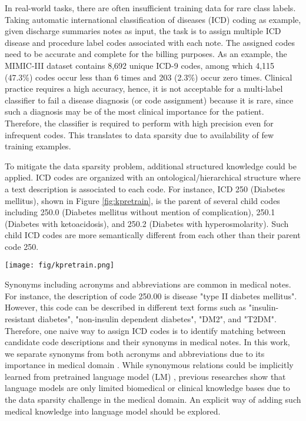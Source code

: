 \documentclass[11pt]{article}
\begin{document}
In real-world tasks, there are often insufficient training data for 
rare class labels. 
Taking automatic international classification of diseases (ICD) coding as example, 
given discharge summaries notes as input, the task is to assign multiple ICD disease and procedure label codes associated with each note. The assigned codes need to be accurate and complete for the billing purposes.
As an example, the MIMIC-III dataset \citep{Johnson2016MIMICIIIAF} contains 8,692 unique ICD-9 codes, among which 4,115 (47.3\%) codes occur less than 6 times and 203 (2.3\%) occur zero times. Clinical practice requires a high accuracy, hence, it is not acceptable 
for a multi-label classifier to fail a disease diagnosis (or code assignment) because it is rare, since such a diagnosis may be of the most clinical importance for the patient. Therefore, the classifier is required to perform with high precision even for infrequent codes. This translates to data sparsity due to availability of few training examples.

To mitigate the data sparsity problem, additional structured knowledge could be applied. ICD codes are organized with an ontological/hierarchical structure where a text description is associated to each code. For instance, ICD 250 (Diabetes mellitus), shown in Figure \ref{fig:kpretrain}, is the parent of several child codes including 250.0 (Diabetes mellitus without mention of complication), 250.1 (Diabetes with ketoacidosis), and 250.2 (Diabetes with hyperosmolarity). Such child ICD codes are more semantically different from each other than their parent code 250. 


\begin{figure*}[t]
	\centering
	\texttt{[image: fig/kpretrain.png]}
	\caption{An illustration of self-alignment pretraining from medical knowledge UMLS, including the usage of (a) Hierarchy, (b) Synonym, (c) Abbreviation. Pink region is the dynamic margin ranges from  to  where we wish to pull negatives apart with a dynamic distance.}
	\label{fig:kpretrain}
\end{figure*}


Synonyms including acronyms and abbreviations are common in medical notes. For instance, the description of code 250.00 is disease "type II diabetes mellitus". However, this code can be described in different text forms such as "insulin-resistant diabetes", "non-insulin dependent diabetes", "DM2", and "T2DM". Therefore, one naive way to assign ICD codes is to identify matching between candidate code descriptions and their synonyms in medical notes. In this work, we separate synonyms from both acronyms and abbreviations due to its importance in medical domain \cite{yu2002mapping}. While synonymous relations could be implicitly learned from pretrained language model (LM)
\citep{Michalopoulos2022ICDBigBirdAC, Li2022ClinicalLongformerAC}, previous researches show that language models are only limited biomedical \citep{sung-etal-2021-language} or clinical knowledge bases \citep{yao2022extracting} due to the data sparsity challenge in the medical domain. 
An explicit way of adding such medical knowledge into language model should be explored.
\end{document}
